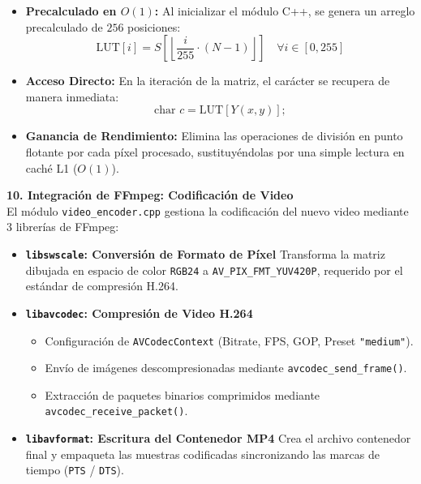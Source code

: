 \documentclass[12pt]{article}
\begin{document}
\vspace{0.5cm}
\begin{itemize}
    \item \textbf{Precalculado en $O(1)$:}
    Al inicializar el módulo C++, se genera un arreglo precalculado de $256$ posiciones:
    $$\text{LUT}[i] = S\left[\left\lfloor \frac{i}{255} \cdot (N - 1) \right\rfloor\right] \quad \forall i \in [0, 255]$$

    \item \textbf{Acceso Directo:}
    En la iteración de la matriz, el carácter se recupera de manera inmediata:
    $$\text{char } c = \text{LUT}[Y(x,y)];$$

    \item \textbf{Ganancia de Rendimiento:}
    Elimina las operaciones de división en punto flotante por cada píxel procesado, sustituyéndolas por una simple lectura en caché L1 ($O(1)$).
\end{itemize}

\newpage

{\Huge \bfseries 10. Integración de FFmpeg: Codificación de Video}\\[0.8cm]

\Large
El módulo \texttt{video\_encoder.cpp} gestiona la codificación del nuevo video mediante 3 librerías de FFmpeg:

\begin{itemize}
    \item \textbf{\texttt{libswscale}: Conversión de Formato de Píxel}
    Transforma la matriz dibujada en espacio de color \texttt{RGB24} a \texttt{AV\_PIX\_FMT\_YUV420P}, requerido por el estándar de compresión H.264.

    \item \textbf{\texttt{libavcodec}: Compresión de Video H.264}
    \begin{itemize}
        \item Configuración de \texttt{AVCodecContext} (Bitrate, FPS, GOP, Preset \texttt{"medium"}).
        \item Envío de imágenes descompresionadas mediante \texttt{avcodec\_send\_frame()}.
        \item Extracción de paquetes binarios comprimidos mediante \texttt{avcodec\_receive\_packet()}.
    \end{itemize}

    \item \textbf{\texttt{libavformat}: Escritura del Contenedor MP4}
    Crea el archivo contenedor final y empaqueta las muestras codificadas sincronizando las marcas de tiempo (\texttt{PTS} / \texttt{DTS}).
\end{itemize}
\end{document}
